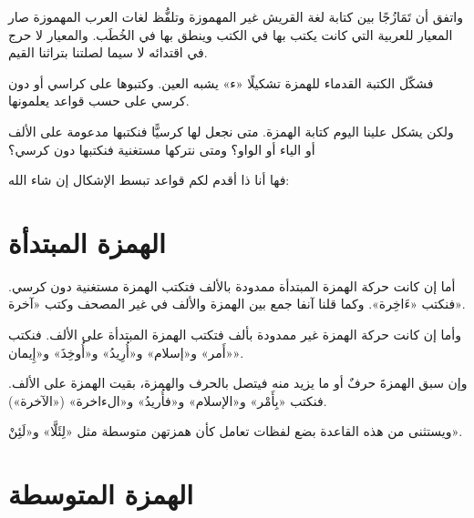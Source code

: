 \documentclass[
  english,
  10pt,
]{article}
\begin{document}
\begin{otherlanguage}{arabic}
واتفق أن تَمَازُجًا بين كتابة لغة القريش غير المهموزة وتلفُّظ لغات العرب
المهموزة صار المعيار للعربية التي كانت يكتب بها في الكتب وينطق بها في
الخُطَب. والمعيار لا حرج في اقتدائه لا سيما لصلتنا بتراثنا القيم.

فشكّل الكتبة القدماء للهمزة تشكيلًا «ء» يشبه العين. وكتبوها على كراسي أو
دون كرسي على حسب قواعد يعلمونها.

ولكن يشكل علينا اليوم كتابة الهمزة. متى نجعل لها كرسيًّا فنكتبها مدعومة
على الألف أو الياء أو الواو؟ ومتى نتركها مستغنية فنكتبها دون كرسي؟

فها أنا ذا أقدم لكم قواعد تبسط الإشكال إن شاء الله:

\end{otherlanguage}

\section{\texorpdfstring{\foreignlanguage{arabic}{\altfamily الهمزة
المبتدأة}}{الهمزة المبتدأة}}\label{ux627ux644ux647ux645ux632ux629-ux627ux644ux645ux628ux62aux62fux623ux629}

\begin{otherlanguage}{arabic}

\altfamily 

أما إن كانت حركة الهمزة المبتدأة ممدودة بالألف فتكتب الهمزة مستغنية دون
كرسي. فنكتب «ءَاخِرة». وكما قلنا آنفا جمع بين الهمزة والألف في غير المصحف
وكتب «آخرة».

وأما إن كانت حركة الهمزة غير ممدودة بألف فتكتب الهمزة المبتدأة على
الألف. فنكتب «أَمر» و«إسلام» و«أُرِيدُ» و«أُوخِذَ» و«إِيمان».

وإن سبق الهمزةَ حرفٌ أو ما يزيد منه فيتصل بالحرف والهمزة، بقيت الهمزة على
الألف. فنكتب «بِأَمْر» و«الإسلام» و«فأُريدُ» و«الءاخرة» («الآخرة»).

ويستثنى من هذه القاعدة بضع لفظات تعامل كأن همزتهن متوسطة مثل «لِئَلَّا»
و«لَئِنْ».

\end{otherlanguage}

\section{\texorpdfstring{\foreignlanguage{arabic}{\altfamily الهمزة
المتوسطة}}{الهمزة المتوسطة}}\label{ux627ux644ux647ux645ux632ux629-ux627ux644ux645ux62aux648ux633ux637ux629}
\end{document}
